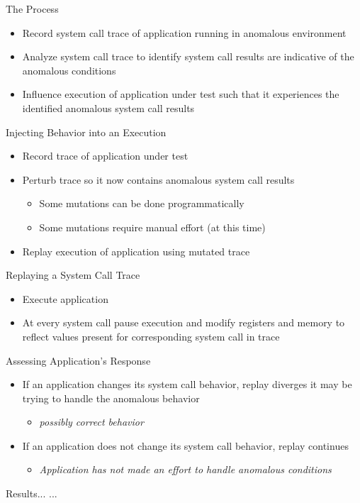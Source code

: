 \documentclass[pdf]{beamer}
\begin{document}
\begin{frame}{The Process}
  \begin{itemize}
  \item{Record system call trace of application running in anomalous
      environment}
  \item{Analyze system call trace to identify system call results are
      indicative of the anomalous conditions}
  \item{Influence execution of application under test such that it experiences
      the identified anomalous system call results}
  \end{itemize}
\end{frame}


\begin{frame}{Injecting Behavior into an Execution}
  \begin{itemize}
  \item{Record trace of application under test}
  \item{Perturb trace so it now contains anomalous system call results}
    \begin{itemize}
    \item{Some mutations can be done programmatically}
    \item{Some mutations require manual effort (at this time)}
    \end{itemize}
  \item{Replay execution of application using mutated trace}
  \end{itemize}
\end{frame}


\begin{frame}{Replaying a System Call Trace}
  \begin{itemize}
  \item{Execute application}
  \item{At every system call pause execution and modify registers and memory
      to reflect values present for corresponding system call in trace}
  \end{itemize}
\end{frame}


\begin{frame}{Assessing Application's Response}
  \begin{itemize}
  \item{If an application changes its system call behavior, replay diverges it may
      be trying to handle the anomalous behavior}
    \begin{itemize}
    \item{\textit{possibly correct behavior}}
    \end{itemize}
  \item{If an application does not change its system call behavior, replay
      continues}
    \begin{itemize}
    \item{\textit{Application has not made an effort to handle anomalous conditions}}
    \end{itemize}
  \end{itemize}
\end{frame}


\begin{frame}{Results...}
...
\end{frame}
\end{document}
